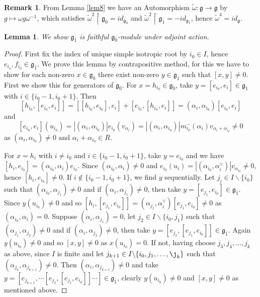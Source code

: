 \documentclass[11pt]{amsart}
\theoremstyle{plain}
\newtheorem{lemma}[thm]{Lemma}
\theoremstyle{definition}
\newtheorem{rmk}[thm]{Remark}
\numberwithin{equation}{section}
\newcommand{\al}{\alpha}
\newcommand{\om}{\omega}
\newcommand{\g}{\mathfrak{g}}
\begin{document}
	\begin{rmk}\label{rmk1}
	From Lemma \ref{lem8} we have an Automorphism $\widetilde{\om}:\g\rightarrow\g$ by $g\mapsto\om g\om^{-1}$, which satisfies $\widetilde{\om}^2\restriction{\g_{\bar{0}}}=id_{\g_{\bar{0}}}$ and $\widetilde{\om}^2\restriction{\g_{\bar{1}}}=-id_{\g_{\bar{1}}}$, hence $\widetilde{\om}^4=id_{\g}$. 	
	\end{rmk}
	\begin{lemma}\label{lem9}
		We show $\g_{\bar{1}}$ is faithful $\g_{\bar{0}}$-module under adjoint action.
	\end{lemma}
	\begin{proof}
		 First fix the index of unique  simple isotropic root by $i_0\in I$, hence $e_{i_o},f_{i_0}\in\g_{\bar{1}}$. We prove this lemma by contrapositive method, for this we have to show for each non-zero $x\in\g_{\bar{0}}$ there exist non-zero $y\in\g_{\bar{1}}$ such that $[x,y]\neq0$. First we show this for generators of $\g_{\bar{0}}$. For $x=h_{i_0}\in\g_{\bar{0}}$, take $y=[e_{i_0},e_i]\in\g_{\bar{1}}$ with $i\in\{i_0-1,i_0+1\}$. Then $$[h_{i_0},[e_{i_0},e_i]]=[[h_{i_0},e_{i_0}],e_i]+[e_{i_0},[h_{i_0},e_i]]=(\al_i,\al_{i_0})[e_{i_0},e_i]$$ and $$[e_{i_0},e_i](u_{i_0})=|(\al_i,\al_{i_0})|e_{i_0}(v_{\al_i})=|(\al_i,\al_{i_0})|m_{i_0}^-(\al_i)v_{\al_i+\al_{i_0}}\neq0$$ as $(\al_i,\al_{i_0})\neq0\text{ and }\al_i+\al_{i_0}\in R$.
		 
		 For $x=h_i$ with $i\neq i_0\text{ and }i\in\{i_0-1,i_0+1\}$, take $y=e_{i_0}$ and we have $[h_i,e_{i_0}]=(\al_{i_0},\al_i)e_{i_0}$. Since $(\al_{i_0},\al_i)\neq0$ and $e_{i_0}(u_i)=|(\al_{i_0},\al_i^{\vee})|v_{\al_{i_0}}\neq0$, hence $[h_i,e_{i_0}]\neq0$. If $i\notin\{i_0-1,i_0+1\}$, we find $y$ sequentially. Let $j_i\in I\backslash\{i_0\}$ such that $(\al_{i_0},\al_{j_1})\neq0$ and if $(\al_i,\al_{j_1})\neq0$, then take $y=[e_{j_1},e_{i_0}]\in\g_{\bar{1}}$. Since $y(u_{i_0})\neq0$ and so $[h_i,[e_{j_1},e_{i_0}]]=(\al_{j_1},\al_i^{\vee})[e_{j_1},e_{i_0}]\neq0$ as $(\al_{i_0},\al_i)=0$. Suppose $(\al_i,\al_{j_1})=0$, let $j_2\in I\backslash\{i_0,j_1\}$ such that $(\al_{j_1},\al_{j_2})\neq0$ and if $(\al_i,\al_{j_2})\neq0$, then take $y=[e_{j_2},[e_{j_1},e_{i_0}]]\in\g_{\bar{1}}$. Again $y(u_{i_0})\neq0$ and so $[x,y]\neq0$ as $x(u_{i_0})=0$. If not, having choose $j_3,j_4,\ldots,j_k$ as above, since $I$ is finite and let $j_{k+1}\in I\backslash\{i_0,j_1,\ldots,\j_k\}$ such that $(\al_{j_k},\al_{j_{k+1}})\neq0$. Then $(\al_i,\al_{j_{k+1}})\neq0$ and take $y=[e_{j_{k+1}},\cdots[e_{j_2},[e_{j_1},e_{i_0}]]\cdots]\in\g_{\bar{1}}$, clearly $y(u_{i_0})\neq0$ and $[x,y]\neq0$ as mentioned above.
		 

\end{proof}
\end{document}

